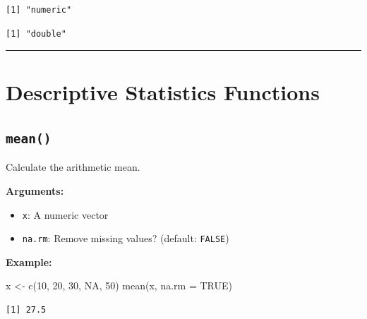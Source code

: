 \documentclass[
  letterpaper,
  DIV=11,
  numbers=noendperiod]{scrreprt}
\newenvironment{Shaded}{\begin{snugshade}}{\end{snugshade}}
\newcommand{\AttributeTok}[1]{\textcolor[rgb]{0.40,0.45,0.13}{#1}}
\newcommand{\ConstantTok}[1]{\textcolor[rgb]{0.56,0.35,0.01}{#1}}
\newcommand{\DecValTok}[1]{\textcolor[rgb]{0.68,0.00,0.00}{#1}}
\newcommand{\FunctionTok}[1]{\textcolor[rgb]{0.28,0.35,0.67}{#1}}
\newcommand{\NormalTok}[1]{\textcolor[rgb]{0.00,0.23,0.31}{#1}}
\newcommand{\OtherTok}[1]{\textcolor[rgb]{0.00,0.23,0.31}{#1}}
\newcommand{\SpecialCharTok}[1]{\textcolor[rgb]{0.37,0.37,0.37}{#1}}
\providecommand{\tightlist}{%
  \setlength{\itemsep}{0pt}\setlength{\parskip}{0pt}}
\begin{document}
\begin{verbatim}
[1] "numeric"
\end{verbatim}

\begin{Shaded}
\end{Shaded}

\begin{verbatim}
[1] "double"
\end{verbatim}

\begin{center}\rule{0.5\linewidth}{0.5pt}\end{center}

\section{Descriptive Statistics
Functions}\label{descriptive-statistics-functions}

\subsection{\texorpdfstring{\texttt{mean()}}{mean()}}\label{mean}

Calculate the arithmetic mean.

\textbf{Arguments:}

\begin{itemize}
\tightlist
\item
  \texttt{x}: A numeric vector
\item
  \texttt{na.rm}: Remove missing values? (default: \texttt{FALSE})
\end{itemize}

\textbf{Example:}

\begin{Shaded}
\begin{Highlighting}[]
\NormalTok{x }\OtherTok{\textless{}{-}} \FunctionTok{c}\NormalTok{(}\DecValTok{10}\NormalTok{, }\DecValTok{20}\NormalTok{, }\DecValTok{30}\NormalTok{, }\ConstantTok{NA}\NormalTok{, }\DecValTok{50}\NormalTok{)}
\FunctionTok{mean}\NormalTok{(x, }\AttributeTok{na.rm =} \ConstantTok{TRUE}\NormalTok{)}
\end{Highlighting}
\end{Shaded}

\begin{verbatim}
[1] 27.5
\end{verbatim}
\end{document}
